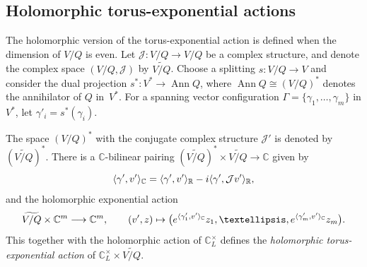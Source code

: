 \documentclass[a4paper]{amsart}
\theoremstyle{definition}
\theoremstyle{remark}
\numberwithin{equation}{section}
\def\R{\mathbb R}
\def\C{\mathbb C}
\def\R{\mathbb R}
\newcommand{\mb}[1]{{\textbf {\textit#1}}}
\def\Ann{\mathop{\mathrm{Ann}}}
\newcommand{\<}{\langle}
\renewcommand{\>}{\rangle}
\begin{document}
\subsection{Holomorphic torus-exponential actions}
The holomorphic version of the torus-exponential action is defined when the dimension of $V/Q$ is even. Let $\mathcal J\colon V/Q\to V/Q$ be a complex structure, and denote the complex space $(V/Q,\mathcal J)$ by $\widetilde{V/Q}$. Choose a splitting $s\colon V/Q\to V$ and consider the dual projection $s^*\colon V^*\to\Ann Q$, where $\Ann Q\cong(V/Q)^*$ denotes the annihilator of $Q$ in~$V^*$. For a spanning vector configuration $\Gamma=\{\gamma_1,\ldots,\gamma_m\}$ in $V^*$, let $\gamma'_i=s^*(\gamma_i)$.

The space $(V/Q)^*$ with the conjugate complex structure $\mathcal J'$ is denoted by~$(\widetilde{V/Q})^*$. There is a $\C$-bilinear pairing $(\widetilde{V/Q})^*
\times\widetilde{V/Q}\to\C$ given by
\[
  \langle\gamma',\mb v'\rangle_\C=\langle\gamma',\mb v'\rangle_\R-
  i\langle\gamma',\mathcal J\mb v'\rangle_\R,
\]
and the holomorphic exponential action
\[
  \widetilde{V/Q}\times\C^m\longrightarrow\C^m,\qquad
  (\mb v',\mb z)\mapsto \bigl(e^{\langle\gamma'_1,\mb
  v'\rangle_\C}z_1,\ldots,e^{\langle\gamma'_m,\mb v'\rangle_\C}z_m\bigr).
\]
This together with the holomorphic action of $\C^\times_L$ defines the \emph{holomorphic torus-exponential action} of $\C^\times_L\times\widetilde{V/Q}$.
\end{document}
